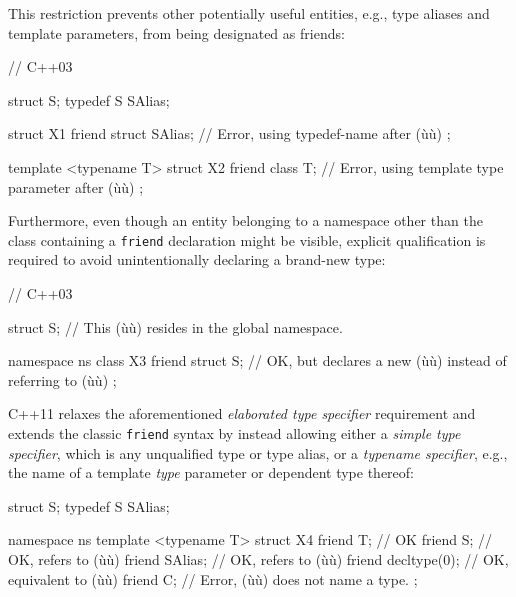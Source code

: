 \noindent This restriction prevents other potentially useful entities, e.g., type
aliases and template parameters, from being designated as friends:

\begin{emcppslisting}
// C++03

struct S;
typedef S SAlias;

struct X1
{
    friend struct SAlias;  // Error, using typedef-name after (ù{}ù)
};

template <typename T>
struct X2
{
    friend class T;        // Error, using template type parameter after (ù{}ù)
};
\end{emcppslisting}
    
\noindent Furthermore, even though an entity belonging to a namespace other than
the class containing a \lstinline!friend! declaration might be visible,
explicit qualification is required to avoid unintentionally declaring a
brand-new type:

\begin{emcppslisting}
// C++03

struct S;  // This (ù{}ù) resides in the global namespace.

namespace ns
{
    class X3
    {
        friend struct S;
            // OK, but declares a new (ù{}ù) instead of referring to (ù{}ù)
    };
}
\end{emcppslisting}
    
\noindent C++11 relaxes the aforementioned \emph{elaborated type specifier}
requirement and extends the classic \lstinline!friend! syntax by instead
allowing either a \emph{simple type specifier}, which is any unqualified
type or type alias, or a \emph{typename specifier}, e.g., the name of a
template \emph{type} parameter or dependent type thereof:

\begin{emcppslisting}
struct S;
typedef S SAlias;

namespace ns
{
    template <typename T>
    struct X4
    {
        friend T;           // OK
        friend S;           // OK, refers to (ù{}ù)
        friend SAlias;      // OK, refers to (ù{}ù)
        friend decltype(0); // OK, equivalent to (ù{}ù)
        friend C;           // Error, (ù{}ù) does not name a type.
    };
}
\end{emcppslisting}
    
